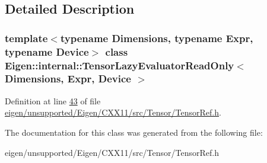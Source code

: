 \subsection{Detailed Description}
\subsubsection*{template$<$typename Dimensions, typename Expr, typename Device$>$\newline
class Eigen\+::internal\+::\+Tensor\+Lazy\+Evaluator\+Read\+Only$<$ Dimensions, Expr, Device $>$}



Definition at line \hyperlink{eigen_2unsupported_2_eigen_2_c_x_x11_2src_2_tensor_2_tensor_ref_8h_source_l00043}{43} of file \hyperlink{eigen_2unsupported_2_eigen_2_c_x_x11_2src_2_tensor_2_tensor_ref_8h_source}{eigen/unsupported/\+Eigen/\+C\+X\+X11/src/\+Tensor/\+Tensor\+Ref.\+h}.



The documentation for this class was generated from the following file\+:\begin{DoxyCompactItemize}
\item 
eigen/unsupported/\+Eigen/\+C\+X\+X11/src/\+Tensor/\+Tensor\+Ref.\+h\end{DoxyCompactItemize}
